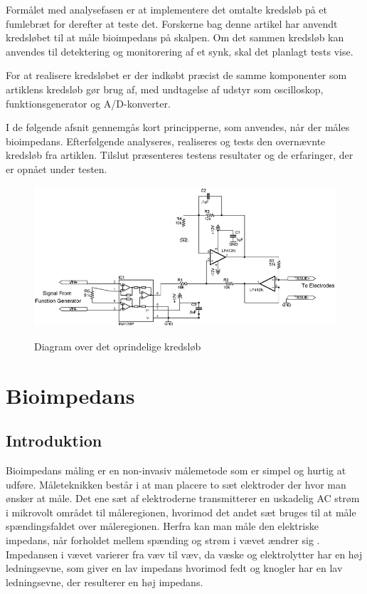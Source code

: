 Formålet med analysefasen er at implementere det omtalte kredsløb på et fumlebræt for derefter at teste det. Forskerne bag denne artikel har anvendt kredsløbet til at måle bioimpedans på skalpen. Om det sammen kredsløb kan anvendes til detektering og monitorering af et synk, skal det planlagt tests vise. 

For at realisere kredsløbet er der indkøbt præcist de samme komponenter  som artiklens kredsløb gør brug af, med undtagelse af udstyr som oscilloskop, funktionsgenerator og A/D-konverter.

I de følgende afsnit gennemgås kort principperne, som anvendes, når der måles bioimpedans.  Efterfølgende analyseres, realiseres og tests den overnævnte kredsløb fra artiklen. Tilslut præsenteres testens resultater og de erfaringer, der er opnået under testen. 



\begin{figure}[H]
\centering
{\includegraphics[width=12cm]
{Figure/BIdiagram}}
\caption{Diagram over det oprindelige kredsløb\cite{Aroom2009}}
\label{fig:BIdiagram}
\end{figure}


\chapter{Bioimpedans}
\section{Introduktion}
Bioimpedans måling  er en non-invasiv målemetode som er simpel og hurtig at udføre. Måleteknikken består i at man placere to sæt elektroder der hvor man ønsker at måle. Det ene sæt af elektroderne transmitterer  en uskadelig AC strøm i mikrovolt området til måleregionen, hvorimod det andet sæt bruges til at måle spændingsfaldet over måleregionen. Herfra kan man måle den elektriske impedans, når forholdet mellem spænding og strøm i vævet ændrer sig . Impedansen i vævet varierer fra væv til væv, da væske og elektrolytter har en høj ledningsevne, som giver en lav impedans hvorimod fedt og knogler har en lav ledningsevne, der resulterer en høj impedans.\cite{Brantlov2017} 
 

